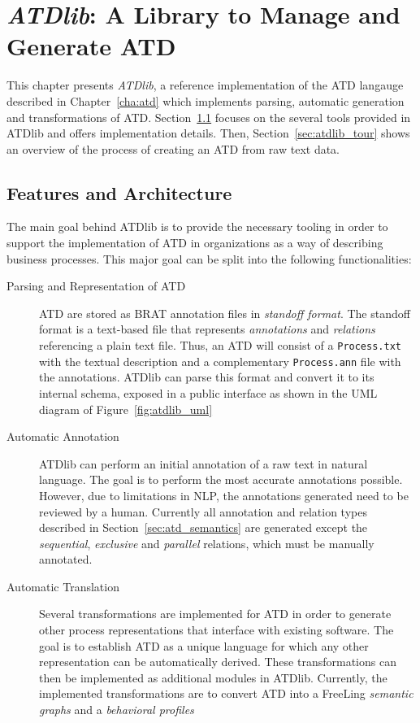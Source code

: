 \chapter{\emph{ATDlib}: A Library to Manage and Generate ATD}
\label{cha:atdlib}

This chapter presents \emph{ATDlib}, a reference implementation of the ATD
langauge described in Chapter~\ref{cha:atd} which implements parsing, automatic
generation and transformations of ATD. Section~\ref{sec:architecture} focuses on
the several tools provided in ATDlib and offers implementation details. Then,
Section~\ref{sec:atdlib_tour} shows an overview of the process of creating an
ATD from raw text data.

\section{Features and Architecture}
\label{sec:architecture}

The main goal behind ATDlib is to provide the necessary tooling in order to
support the implementation of ATD in organizations as a way of describing
business processes. This major goal can be split into the following
functionalities:


\begin{description}
  \item[Parsing and Representation of ATD]{ATD are stored as BRAT annotation
      files in \emph{standoff format}\cite{brat_standoff}. The standoff format
      is a text-based file that represents \emph{annotations} and
      \emph{relations} referencing a plain text file. Thus, an ATD will consist
      of a \texttt{Process.txt} with the textual description and a complementary
      \texttt{Process.ann} file with the annotations. ATDlib can parse this
      format and convert it to its internal schema, exposed in a public
      interface as shown in the UML diagram of Figure~\ref{fig:atdlib_uml}}
  \item[Automatic Annotation]{ATDlib can perform an initial annotation of a raw
      text in natural language. The goal is to perform the most accurate
      annotations possible. However, due to limitations in NLP, the annotations
      generated need to be reviewed by a human. Currently all annotation and
      relation types described in Section~\ref{sec:atd_semantics} are generated
      except the \emph{sequential}, \emph{exclusive} and \emph{parallel}
      relations, which must be manually annotated.}
  \item[Automatic Translation]{Several transformations are implemented for ATD
      in order to generate other process representations that interface with
      existing software. The goal is to establish ATD as a unique language for
      which any other representation can be automatically derived. These
      transformations can then be implemented as additional modules in ATDlib.
      Currently, the implemented transformations are to convert ATD into a
      FreeLing\cite{PadroS12} \emph{semantic graphs} and a \emph{behavioral
        profiles}\cite{smirnov2010business}}
    
\end{description}


